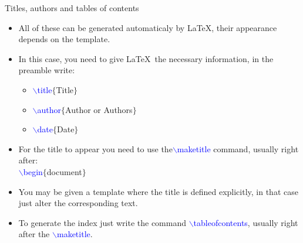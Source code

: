 \documentclass[usenames,dvipsnames,aspectratio=169]{beamer}
\newcommand{\aitem}{\item[$\cdot$]}
\newcommand{\bitem}{\item[-]}
\begin{document}

%

\begin{frame}[t]{Titles, authors and tables of contents}
\begin{itemize}
\aitem All of these can be generated automaticaly by \LaTeX, their appearance depends on the template.
\aitem In this case, you need to give \LaTeX~the necessary information, in the preamble write:
\begin{itemize}
\bitem \textcolor{blue}{$\backslash$title}\textcolor{PineGreen}{$\{$Title$\}$}
\bitem \textcolor{blue}{$\backslash$author}\textcolor{PineGreen}{$\{$Author or Authors$\}$}
\bitem \textcolor{blue}{$\backslash$date}\textcolor{PineGreen}{$\{$Date$\}$}
\end{itemize}
\aitem For the title to appear you need to use the\textcolor{blue}{$\backslash$maketitle} command, usually right after:\\
\textcolor{blue}{$\backslash$begin}\textcolor{PineGreen}{$\{$document$\}$}
\aitem You may be given a template where the title is defined explicitly, in that case just alter the corresponding text.
\aitem To generate the index just write the command \textcolor{blue}{$\backslash$tableofcontents}, usually right after the \textcolor{blue}{$\backslash$maketitle}.
\end{itemize}
\end{frame}


\end{document}

